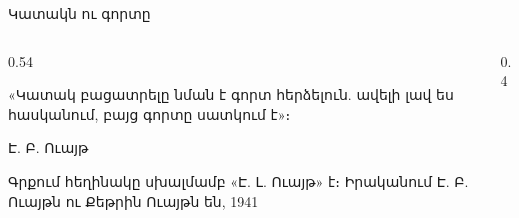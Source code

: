 
\begin{frame}{Կատակն ու գորտը}
  \begin{columns}[c]
    \begin{column}{0.54\textwidth}
      \begin{bookquote}
        «Կատակ բացատրելը նման է գորտ հերձելուն. ավելի լավ ես հասկանում, բայց գորտը սատկում է»։\par\smallskip
        {\small Է. Բ. Ուայթ}
      \end{bookquote}
      {\scriptsize Գրքում հեղինակը սխալմամբ «Է. Լ. Ուայթ» է։ Իրականում Է. Բ. Ուայթն ու Քեթրին Ուայթն են, 1941}
    \end{column}
    \begin{column}{0.4\textwidth}
    \end{column}
  \end{columns}
\end{frame}

